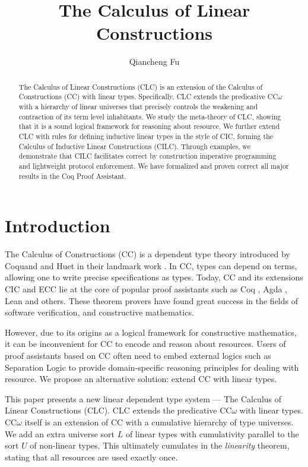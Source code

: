 \documentclass[sigplan,screen,review,anonymous]{acmart}
\title{The Calculus of Linear Constructions}
\author{Qiancheng Fu}
\affiliation{
  \institution{Boston University}
  \city{Boston}
  \state{MA}
  \country{USA}
}
\begin{document}
\begin{abstract}
  The Calculus of Linear Constructions (CLC) is an extension of the Calculus of Constructions (CC) with linear types. Specifically, CLC extends the predicative CC$\omega$ with a hierarchy of linear universes that precisely controls the weakening and contraction of its term level inhabitants. We study the meta-theory of CLC, showing that it is a sound logical framework for reasoning about resource. We further extend CLC with rules for defining inductive linear types in the style of CIC, forming the Calculus of Inductive Linear Constructions (CILC). Through examples, we demonstrate that CILC facilitates correct by construction imperative programming and lightweight protocol enforcement. We have formalized and proven correct all major results in the Coq Proof Assistant.
\end{abstract}
\maketitle

\section{Introduction}
The Calculus of Constructions (CC) is a dependent type theory introduced by Coquand and Huet in their landmark work \cite{cc}. In CC, types can depend on terms, allowing one to write precise specifications as types. Today, CC and its extensions CIC \cite{cic} and ECC \cite{ecc} lie at the core of popular proof assistants such as Coq \cite{coq}, Agda \cite{agda}, Lean \cite{lean} and others. These theorem provers have found great success in the fields of software verification, and constructive mathematics.

However, due to its origins as a logical framework for constructive mathematics, it can be inconvenient for CC to encode and reason about resources. Users of proof assistants based on CC often need to embed external logics such as Separation Logic to provide domain-specific reasoning principles for dealing with resource. We propose an alternative solution: extend CC with linear types.

This paper presents a new linear dependent type system --- The Calculus of Linear Constructions (CLC). CLC extends the predicative CC$\omega$ with linear types. CC$\omega$ itself is an extension of CC with a cumulative hierarchy of type universes. We add an extra universe sort $L$ of linear types with cumulativity parallel to the sort $U$ of non-linear types. This ultimately cumulates in the \textit{linearity} theorem, stating that all resources are used exactly once.
\end{document}
